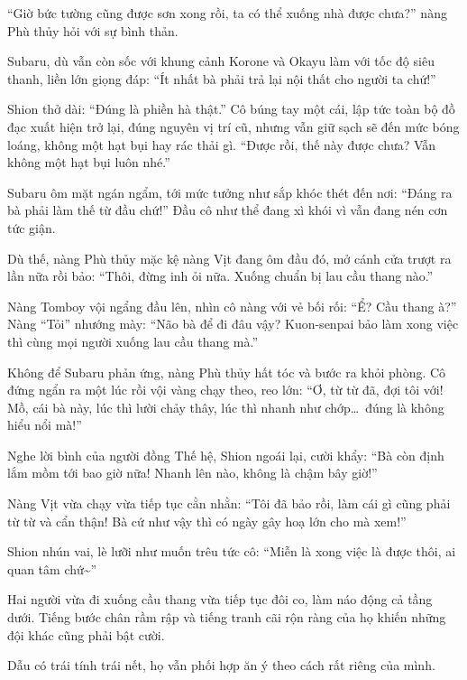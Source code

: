 \documentclass[../main.tex]{subfiles}
\begin{document}
``Giờ bức tường cũng được sơn xong rồi, ta có thể xuống nhà được chưa?'' nàng Phù thủy hỏi với sự bình thản.

Subaru, dù vẫn còn sốc với khung cảnh Korone và Okayu làm với tốc độ siêu thanh, liền lớn giọng đáp: ``Ít nhất bà phải trả lại nội thất cho người ta chứ!''

Shion thở dài: ``Đúng là phiền hà thật.'' Cô búng tay một cái, lập tức toàn bộ đồ đạc xuất hiện trở lại, đúng nguyên vị trí cũ, nhưng vẫn giữ sạch sẽ đến mức bóng loáng, không một hạt bụi hay rác thải gì. ``Được rồi, thế này được chưa? Vẫn không một hạt bụi luôn nhé.''

Subaru ôm mặt ngán ngẩm, tới mức tưởng như sắp khóc thét đến nơi: ``Đáng ra bà phải làm thế từ đầu chứ!'' Đầu cô như thể đang xì khói vì vẫn đang nén cơn tức giận.

Dù thế, nàng Phù thủy mặc kệ nàng Vịt đang ôm đầu đó, mở cánh cửa trượt ra lần nữa rồi bảo: ``Thôi, đừng inh ỏi nữa. Xuống chuẩn bị lau cầu thang nào.''

Nàng Tomboy vội ngẩng đầu lên, nhìn cô nàng với vẻ bối rối: ``Ể? Cầu thang à?'' Nàng ``Tỏi'' nhướng mày: ``Não bà để đi đâu vậy? Kuon-senpai bảo làm xong việc thì cùng mọi người xuống lau cầu thang mà.''

Không để Subaru phản ứng, nàng Phù thủy hất tóc và bước ra khỏi phòng. Cô đứng ngẩn ra một lúc rồi vội vàng chạy theo, reo lớn: ``Ơ, từ từ đã, đợi tôi với! Mồ, cái bà này, lúc thì lười chảy thây, lúc thì nhanh như chớp\dots\ đúng là không hiểu nổi mà!''

Nghe lời bình của người đồng Thế hệ, Shion ngoái lại, cười khẩy: ``Bà còn định lắm mồm tới bao giờ nữa! Nhanh lên nào, không là chậm bây giờ!''

Nàng Vịt vừa chạy vừa tiếp tục cằn nhằn: ``Tôi đã bảo rồi, làm cái gì cũng phải từ từ và cẩn thận! Bà cứ như vậy thì có ngày gây hoạ lớn cho mà xem!''

Shion nhún vai, lè lưỡi như muốn trêu tức cô: ``Miễn là xong việc là được thôi, ai quan tâm chứ\~{}''

Hai người vừa đi xuống cầu thang vừa tiếp tục đôi co, làm náo động cả tầng dưới. Tiếng bước chân rầm rập và tiếng tranh cãi rộn ràng của họ khiến những đội khác cũng phải bật cười.

Dẫu có trái tính trái nết, họ vẫn phối hợp ăn ý theo cách rất riêng của mình.

\vspace{-40pt} \subsubsection*{\label{ep-003.IVc}} 
\end{document}
